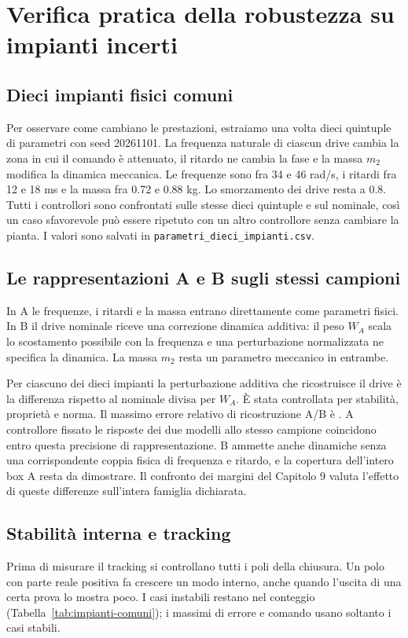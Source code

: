 \chapter{Verifica pratica della robustezza su impianti incerti}

\section{Dieci impianti fisici comuni}
Per osservare come cambiano le prestazioni, estraiamo una volta
dieci quintuple di parametri con seed 20261101. La frequenza
naturale di ciascun drive cambia la zona in cui il comando è
attenuato, il ritardo ne cambia la fase e la massa $m_2$ modifica
la dinamica meccanica. Le frequenze sono fra 34 e 46 rad/s, i
ritardi fra 12 e 18 ms e la massa fra 0.72 e 0.88 kg. Lo
smorzamento dei drive resta a 0.8. Tutti i controllori sono
confrontati sulle stesse dieci quintuple e sul nominale, così
un caso sfavorevole può essere ripetuto con un altro controllore
senza cambiare la pianta. I valori sono salvati in
\texttt{parametri\_dieci\_impianti.csv}.


\section{Le rappresentazioni A e B sugli stessi campioni}
In A le frequenze, i ritardi e la massa entrano direttamente
come parametri fisici. In B il drive nominale riceve una
correzione dinamica additiva: il peso $W_A$ scala lo
scostamento possibile con la frequenza e una perturbazione
normalizzata ne specifica la dinamica. La massa $m_2$ resta
un parametro meccanico in entrambe.

Per ciascuno dei dieci impianti la perturbazione additiva
che ricostruisce il drive è la differenza rispetto al nominale
divisa per $W_A$. È stata controllata per stabilità, proprietà
e norma. Il massimo errore relativo di ricostruzione A/B è
\FinErroreAB. A controllore fissato le risposte dei due modelli
allo stesso campione coincidono entro questa precisione di
rappresentazione. B ammette anche dinamiche senza una
corrispondente coppia fisica di frequenza e ritardo, e la
copertura dell'intero box A resta da dimostrare. Il confronto
dei margini del Capitolo 9 valuta l'effetto di queste differenze
sull'intera famiglia dichiarata.

\section{Stabilità interna e tracking}
Prima di misurare il tracking si controllano tutti i poli
della chiusura. Un polo con parte reale positiva fa crescere
un modo interno, anche quando l'uscita di una certa prova
lo mostra poco. I casi instabili restano nel conteggio
(Tabella~\ref{tab:impianti-comuni}); i massimi di errore e
comando usano soltanto i casi stabili.

